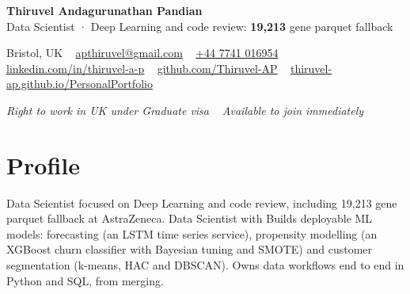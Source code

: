 \documentclass[a4paper,11pt]{article}
\newcommand{\num}[1]{\textbf{#1}}   %
\begin{document}
\begin{center}
  {\fontsize{22}{26}\selectfont\bfseries\color{navy} Thiruvel Andagurunathan Pandian}\\[5pt]
  {\fontsize{12}{14}\selectfont\color{navy} Data Scientist · Deep Learning and code review: \num{19,213} gene parquet fallback}\\[4pt]
  {\small
  Bristol, UK\nobreak\ \,\textperiodcentered\, \href{mailto:apthiruvel@gmail.com}{apthiruvel@gmail.com}\nobreak\ \,\textperiodcentered\, \href{tel:+447741016954}{+44 7741 016954}\nobreak\ \,\textperiodcentered\, \href{https://www.linkedin.com/in/thiruvel-a-p/}{linkedin.com/in/thiruvel-a-p}\nobreak\ \,\textperiodcentered\, \href{https://github.com/Thiruvel-AP}{github.com/Thiruvel-AP}\nobreak\ \,\textperiodcentered\, \href{https://thiruvel-ap.github.io/PersonalPortfolio/}{thiruvel-ap.github.io/PersonalPortfolio}\par}
  \vspace{3pt}
  {\small\itshape\color{muted} Right to work in UK under Graduate visa\nobreak\ \,\textperiodcentered\, Available to join immediately\par}
\end{center}

\section{Profile}
Data Scientist focused on Deep Learning and code review, including 19,213 gene parquet fallback at AstraZeneca. Data Scientist with Builds deployable ML models: forecasting (an LSTM time series service), propensity modelling (an XGBoost churn classifier with Bayesian tuning and SMOTE) and customer segmentation (k-means, HAC and DBSCAN). Owns data workflows end to end in Python and SQL, from merging.
\end{document}
